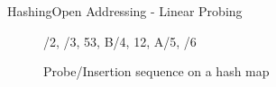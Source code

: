 \begin{frame}{Hashing}{Open Addressing - Linear Probing}
\begin{itemize}
\begin{figure}[!h]
{          \relax/2,
          \relax/3,
          {53, {\color{green2}B}}/4,
          {12, {\color{green2}A}}/5,
          \relax/6
        }%
        \def\LPEShowIndex{0}%
        \begin{adjustbox}{width=0.75\linewidth}%
        \end{adjustbox}
        \vspace{-0.5em}%
        \caption{Probe/Insertion sequence on a hash map}%
        \label{fig:hashing:open_addressing:linear_probing_example2}%
      \end{figure}
  \end{itemize}
\end{frame}



